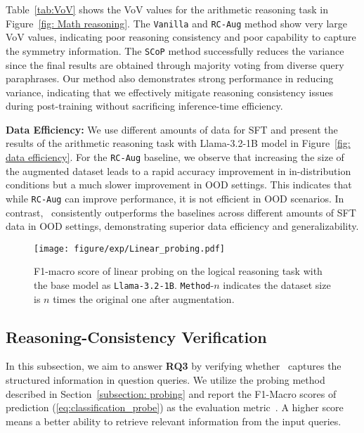Table~\ref{tab:VoV} shows the VoV values for the arithmetic reasoning task in Figure~\ref{fig: Math reasoning}. The \texttt{Vanilla} and \texttt{RC-Aug} method show very large VoV values, indicating poor reasoning consistency and poor capability to capture the symmetry information. The \texttt{SCoP} method successfully reduces the variance since the final results are obtained through majority voting from diverse query paraphrases. Our method also demonstrates strong performance in reducing variance, indicating that we effectively mitigate reasoning consistency issues during post-training without sacrificing inference-time efficiency. 

\textbf{Data Efficiency:} We use different amounts of data for SFT and present the results of the arithmetic reasoning task with {Llama-3.2-1B} model in Figure~\ref{fig: data efficiency}. For the \texttt{RC-Aug} baseline, we observe that increasing the size of the augmented dataset leads to a rapid accuracy improvement in in-distribution conditions but a much slower improvement in OOD settings. This indicates that while \texttt{RC-Aug} can improve performance, it is not efficient in OOD scenarios. 
In contrast, \method\ consistently outperforms the baselines across different amounts of SFT data in OOD settings, demonstrating superior data efficiency and generalizability.




\begin{figure}[t]
    \centering
    \texttt{[image: figure/exp/Linear\_probing.pdf]}
    \vspace{-3mm}
    \caption{F1-macro score of linear probing on the logical reasoning task with the base model as \texttt{Llama-3.2-1B}. \texttt{Method}-$n$ indicates the dataset size is $n$ times the original one after augmentation.}
    \label{fig: Linear probing}
    \vspace{-4mm}
\end{figure}

\subsection{Reasoning-Consistency Verification} 
In this subsection, we aim to answer \textbf{RQ3} by verifying whether \method\ captures the structured information in question queries. We utilize the probing method described in Section~\ref{subsection: probing} and report the F1-Macro scores of prediction (\ref{eq:classification_probe}) as the evaluation metric~\citep{hou2023towards}. A higher score means a better ability to retrieve relevant information from the input queries.



